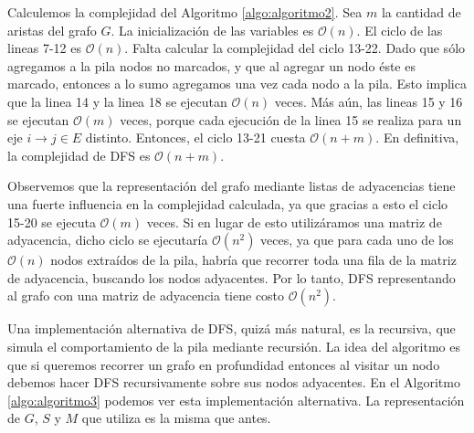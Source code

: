Calculemos la complejidad del Algoritmo \ref{algo:algoritmo2}. Sea $m$ la cantidad de aristas del grafo $G$. La inicialización de las variables es $\mathcal{O}(n)$. El ciclo de las lineas 7-12 es $\mathcal{O}(n)$. Falta calcular la complejidad del ciclo 13-22. Dado que sólo agregamos a la pila nodos no marcados, y que al agregar un nodo éste es marcado, entonces a lo sumo agregamos una vez cada nodo a la pila. Esto implica que la linea 14 y la linea 18 se ejecutan $\mathcal{O}(n)$ veces. Más aún, las lineas 15 y 16 se ejecutan $\mathcal{O}(m)$ veces, porque cada ejecución de la linea 15 se realiza para un eje $i \to j \in E$ distinto. Entonces, el ciclo 13-21 cuesta $\mathcal{O}(n + m)$. En definitiva, la complejidad de DFS es $\mathcal{O}(n + m)$. 

Observemos que la representación del grafo mediante listas de adyacencias tiene una fuerte influencia en la complejidad calculada, ya que gracias a esto el ciclo 15-20 se ejecuta $\mathcal{O}(m)$ veces. Si en lugar de esto utilizáramos una matriz de adyacencia, dicho ciclo se ejecutaría $\mathcal{O}(n^2)$ veces, ya que para cada uno de los $\mathcal{O}(n)$ nodos extraídos de la pila, habría que recorrer toda una fila de la matriz de adyacencia, buscando los nodos adyacentes. Por lo tanto, DFS representando al grafo con una matriz de adyacencia tiene costo $\mathcal{O}(n^2)$. 

Una implementación alternativa de DFS, quizá más natural, es la recursiva, que simula el comportamiento de la pila mediante recursión. La idea del algoritmo es que si queremos recorrer un grafo en profundidad entonces al visitar un nodo debemos hacer DFS recursivamente sobre sus nodos adyacentes. En el Algoritmo \ref{algo:algoritmo3} podemos ver esta implementación alternativa. La representación de $G$, $S$ y $M$ que utiliza es la misma que antes.

\begin{algorithm}
	\dontprintsemicolon
 	\BlankLine
\caption{$\textsc{Recursive-DFS}$}
\label{algo:algoritmo3}
\end{algorithm}

\begin{algorithm}
	\dontprintsemicolon
	\Output{-}
 	\BlankLine
\caption{$\textsc{DFS-Visit}$}
\label{algo:algoritmo4}
\end{algorithm}

